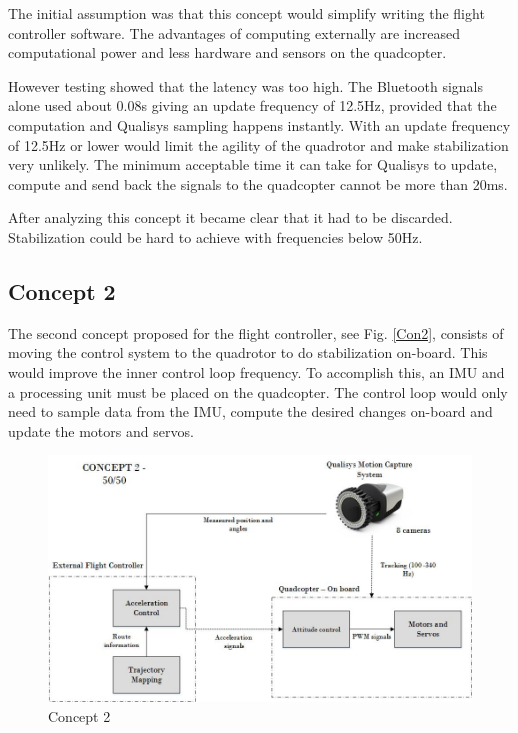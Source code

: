 The initial assumption was that this concept would simplify writing the flight controller software. The advantages of computing externally are increased computational power and less hardware and sensors on the quadcopter. \bigskip

However testing showed that the latency was too high. The Bluetooth signals alone used about 0.08s giving an update frequency of 12.5Hz, provided that the computation and Qualisys sampling happens instantly. With an update frequency of 12.5Hz or lower would limit the agility of the quadrotor and make stabilization very unlikely. The minimum acceptable time it can take for Qualisys to update, compute and send back the signals to the quadcopter cannot be more than 20ms. \bigskip

After analyzing this concept it became clear that it had to be discarded. Stabilization could be hard to achieve with frequencies below 50Hz.\\

\clearpage
\subsection{Concept 2}
The second concept proposed for the flight controller, see Fig. \ref{Con2}, consists of moving the control system to the quadrotor to do stabilization on-board. This would improve the inner control loop frequency. To accomplish this, an IMU and a processing unit must be placed on the quadcopter. The control loop would only need to sample data from the IMU, compute the desired changes on-board and update the motors and servos.

\begin{figure}[H]
          \centering
            \includegraphics[scale = 0.67]{VAPIQ-PICTURES/Concept2.jpg}
                \caption{Concept 2}
                \label{Con2}
            \label{dir}
\end{figure} 
\\

